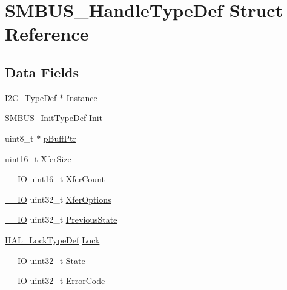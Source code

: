 \hypertarget{struct_s_m_b_u_s___handle_type_def}{}\section{S\+M\+B\+U\+S\+\_\+\+Handle\+Type\+Def Struct Reference}
\label{struct_s_m_b_u_s___handle_type_def}
\subsection*{Data Fields}
\begin{DoxyCompactItemize}
\item 
\hyperlink{struct_i2_c___type_def}{I2\+C\+\_\+\+Type\+Def} $\ast$ \hyperlink{struct_s_m_b_u_s___handle_type_def_a8bdec20782b6b99587806437094c43d2}{Instance}
\item 
\hyperlink{struct_s_m_b_u_s___init_type_def}{S\+M\+B\+U\+S\+\_\+\+Init\+Type\+Def} \hyperlink{struct_s_m_b_u_s___handle_type_def_a930c8079019ff72009a76aff3cd49392}{Init}
\item 
uint8\+\_\+t $\ast$ \hyperlink{struct_s_m_b_u_s___handle_type_def_ae5b117ad14c78eb266b018fb972e315e}{p\+Buff\+Ptr}
\item 
uint16\+\_\+t \hyperlink{struct_s_m_b_u_s___handle_type_def_a51999331ab800faccdb97383b39819dd}{Xfer\+Size}
\item 
\hyperlink{core__sc300_8h_aec43007d9998a0a0e01faede4133d6be}{\+\_\+\+\_\+\+IO} uint16\+\_\+t \hyperlink{struct_s_m_b_u_s___handle_type_def_a49bf3cd0e9bcb9f41f161663f513f405}{Xfer\+Count}
\item 
\hyperlink{core__sc300_8h_aec43007d9998a0a0e01faede4133d6be}{\+\_\+\+\_\+\+IO} uint32\+\_\+t \hyperlink{struct_s_m_b_u_s___handle_type_def_a275aa3c8180a03dbe4bf55fafba3e892}{Xfer\+Options}
\item 
\hyperlink{core__sc300_8h_aec43007d9998a0a0e01faede4133d6be}{\+\_\+\+\_\+\+IO} uint32\+\_\+t \hyperlink{struct_s_m_b_u_s___handle_type_def_aa74abfd1a56073ae8c2c826db1be0628}{Previous\+State}
\item 
\hyperlink{stm32f0xx__hal__def_8h_ab367482e943333a1299294eadaad284b}{H\+A\+L\+\_\+\+Lock\+Type\+Def} \hyperlink{struct_s_m_b_u_s___handle_type_def_ad4cf225029dbefe8d3fe660c33b8bb6b}{Lock}
\item 
\hyperlink{core__sc300_8h_aec43007d9998a0a0e01faede4133d6be}{\+\_\+\+\_\+\+IO} uint32\+\_\+t \hyperlink{struct_s_m_b_u_s___handle_type_def_ae822ffccdec1899d5cfcbab448119810}{State}
\item 
\hyperlink{core__sc300_8h_aec43007d9998a0a0e01faede4133d6be}{\+\_\+\+\_\+\+IO} uint32\+\_\+t \hyperlink{struct_s_m_b_u_s___handle_type_def_a123c5063e6a3b1901b2fbe5f88c53a7e}{Error\+Code}
\end{DoxyCompactItemize}


